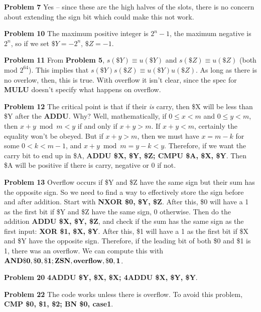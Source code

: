 \vskip 0.1in
\noindent
{\bf Problem 7} Yes -- since these are the high halves of the slots, there is no
concern about extending the sign bit which could make this not work.

\vskip 0.1in
\noindent
{\bf Problem 10} The maximum positive integer is $2^n-1$, the maximum negative
is $2^n$, so if we set $\$Y = -2^n$, $\$Z=-1$.

\vskip 0.1in
\noindent
{\bf Problem 11} From {\bf Problem 5}, $s\left(\$Y\right) \equiv u\left(\$Y\right)$
 and $s\left(\$Z\right) \equiv u\left(\$Z\right)$ (both mod $2^{64}$).  This implies
 that $s\left(\$Y\right) s\left(\$Z\right) \equiv u\left(\$Y\right) u\left(\$Z\right)$.
 As long as there is no overlow, then, this is true.  With overflow it isn't clear, 
 since the spec for {\bf MULU} doesn't specify what happens on overflow.
 
\vskip 0.1in
 \noindent
 {\bf Problem 12} The critical point is that if their {\it is} carry, then 
 \$X will be less than \$Y after the {\bf ADDU}.  Why?  Well,
 mathematically, if $0 \leq x < m$ and $0 \leq y < m$, then $x + y \bmod m < y$
 if and only if $x + y > m$.  If $x + y < m$, certainly the equality won't
 be obeyed.  But if $x + y > m$, then we must have $x = m - k$ for some $0 < k < m-1$,
 and $x + y \bmod m = y - k < y$. Therefore, if we want
 the carry bit to end up in \$A, {\bf ADDU \$X, \$Y, \$Z; CMPU \$A, \$X, \$Y}.
 Then \$A will be positive if there is carry, negative or 0 if not.

\vskip 0.1in
\noindent
{\bf Problem 13} Overflow occurs if \$Y and \$Z have the same sign
but their sum has the opposite sign.  So we need to find a way to
effectively store the sign before and after addition.  Start with
{\bf NXOR \$0, \$Y, \$Z}.  After this, \$0 will have a 1 as the first bit if 
\$Y and \$Z have the same sign, 0 otherwise. Then do the addition 
{\bf ADDU \$X, \$Y, \$Z}, and check if the sum has the same sign as the first
input: {\bf XOR \$1, \$X, \$Y}.  After this, \$1 will have a 1 as the first
bit if \$X and \$Y have the opposite sign.  Therefore, if the leading bit of
both \$0 and \$1 is 1, there was an overflow.  We can compute this with
${\bf AND \$0, \$0, \$1; ZSN, overflow, \$0, 1}$.
 
\vskip 0.1in
 \noindent
{\bf Problem 20} {\bf 4ADDU \$Y, \$X, \$X; 4ADDU \$X, \$Y, \$Y}.

\vskip 0.1in
\noindent
{\bf Problem 22} The code works unless there is overflow.  To avoid
this problem, {\bf CMP \$0, \$1, \$2; BN \$0, case1}.  

